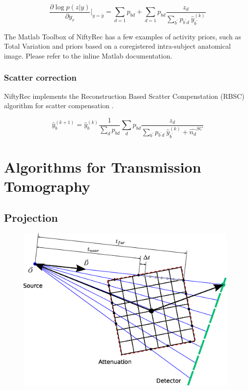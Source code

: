 \documentclass[12pt,a4paper]{report}
\begin{document}
\begin{equation}
 \frac{\partial \log p(z|y)}{\partial y_{r}}\vert_{y=\bar{y}} = \sum_{d=1}{p_{bd}} + \sum_{d=1}p_{bd}{\frac{z_d}{ \sum_{b^{\prime}}p_{b^{\prime}d}\ \hat{y}^{(k)}_{b^{\prime}} }}
\end{equation}

The Matlab Toolbox of
NiftyRec has a few examples of activity priors, such as Total Variation and
priors based on a coregistered intra-subject anatomical image. Please refer
to the inline Matlab documentation.

\subsubsection{Scatter correction}
NiftyRec implements the Reconstruction Based Scatter Compenstation (RBSC) algorithm for scatter compensation \cite{kadrmas_1998}.

\begin{equation}
 \hat{y}_b^{(k+1)} = \hat{y}_b^{(k)} \frac{1}{\sum_{d}{p_{bd}}} \sum_{d}{p_{bd}\frac{z_d}{\sum_{b^{\prime}}p_{b^{\prime}d}\ \hat{y}^{(k)}_{b^{\prime}} + \hat{n_d}^{SC} }}
\end{equation}

\section{Algorithms for Transmission Tomography}
\subsection{Projection}

\begin{figure}[h]
\centering
\includegraphics[width=4.3in]{tt_ray_raycast}
\caption{ }
\label{fig_raycast}
\end{figure}
\end{document}
